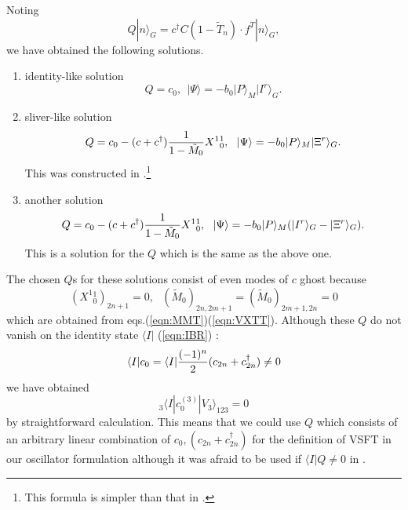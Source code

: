 \documentclass[12pt,a4paper]{article}
\def\T{{\tilde T}}
\def\M0{{\tilde M}_0}
\begin{document}
Noting
\begin{equation}
Q|n\rangle_G=c^\dagger C(1-\T_n)\cdot f^T |n\rangle_G,
\end{equation}
we have obtained the following solutions.
\begin{enumerate}
\item identity-like solution
\begin{equation}
Q=c_0,\ \ |\Psi\rangle=-b_0|P\rangle_M |I^r\rangle_G.
\end{equation}

\item sliver-like solution 
\begin{equation}
Q=c_0-(c+c^\dagger){1\over1-\M0 }X^1{}^1_0,\ \ |\Psi\rangle=-b_0|P\rangle_M |\Xi^r\rangle_G.
\end{equation}
This was constructed in \cite{HK}.\footnote{
	This formula is simpler than that in \cite{HK}.
}

\item another solution
\begin{equation}
Q=c_0-(c+c^\dagger){1\over1-\M0 }X^1{}^1_0,\ \ |\Psi\rangle=-b_0|P\rangle_M(|I^r\rangle_G-|\Xi^r\rangle_G).
\end{equation}
This is a solution for the $Q$ which is the same as the above one.
\end{enumerate}

The chosen $Q$s for these solutions consist of even modes of $c$ ghost because
\begin{equation}
(X^1{}^1_0)_{2n+1}=0,\ \ \ (\M0)_{2n,2m+1}=(\M0)_{2m+1,2n}=0
\end{equation}
which are obtained from eqs.(\ref{eqn:MMT})(\ref{eqn:VXTT}).
Although these $Q$ do not vanish on the identity state $\langle I|$ (\ref{eqn:IBR}) :
\begin{equation}
\langle I|c_0=\langle I|{(-1)^n\over2}(c_{2n}+c_{2n}^\dagger)\not=0
\end{equation}
we have obtained
\begin{equation}
\label{eqn:C0IV}
{}_3\langle I|c_0^{(3)}|V_3\rangle_{123}=0
\end{equation}
by straightforward calculation. 
This means that we could use $Q$ which consists of an arbitrary linear combination of $c_0,(c_{2n}+c^\dagger_{2n})$ for the definition of VSFT in our oscillator formulation although it was afraid to be used if $\langle I|Q\not=0$ in \cite{VSFT}.\\
\end{document}
